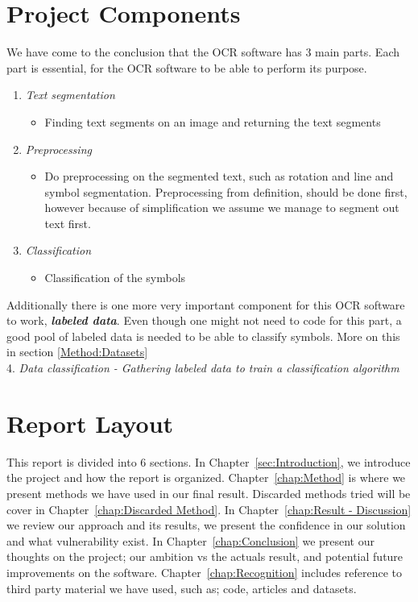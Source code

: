 \documentclass[Report.tex]{subfiles}
\begin{document}
\section{Project Components}
We have come to the conclusion that the OCR software has 3 main parts. Each
part is essential, for the OCR software to be able to perform its purpose.
\begin{enumerate}
 \item{\textit{Text segmentation}}
 \begin{itemize}
  \item{Finding text segments on an image and returning the text segments}
 \end{itemize}
 \item{\textit{Preprocessing}}
 \begin{itemize}
  \item{Do preprocessing on the segmented text, such as rotation and line and
  symbol segmentation. Preprocessing from definition, should be done first,
  however because of simplification we assume we manage to segment out text
  first.}
 \end{itemize}
 \item{\textit{Classification}}
 \begin{itemize}
  \item{Classification of the symbols}
 \end{itemize}
\end{enumerate}

\begin{flushleft}
  Additionally there is one more very important component for this
  OCR software to work, \textit{\textbf{labeled data}}. Even though one might not
  need to code for this part, a good pool of labeled data is needed to be able to
  classify symbols. More on this in section \ref{Method:Datasets} \\
  4. \textit{Data classification - Gathering labeled data to train a classification algorithm}
\end{flushleft}

\section{Report Layout}
\label{subsec:Report Layout}
This report is divided into 6 sections. In
Chapter~\ref{sec:Introduction}, we introduce the project and how the report
is organized. Chapter~\ref{chap:Method} is where we present methods we have
used in our final result. Discarded methods tried will be cover in Chapter~\ref{chap:Discarded Method}.
In Chapter~\ref{chap:Result - Discussion} we review our approach and
its results, we present the confidence in our solution and what vulnerability
exist. In Chapter~\ref{chap:Conclusion} we present our thoughts on the project;
our ambition vs the actuals result, and potential future improvements on the software.
Chapter~\ref{chap:Recognition} includes reference to third party
material we have used, such as; code, articles and datasets.
\end{document}
